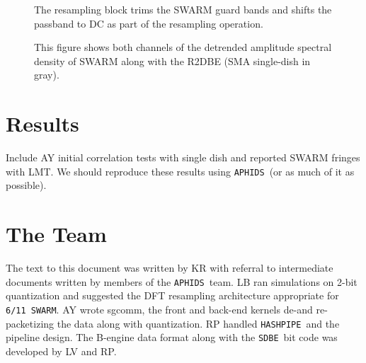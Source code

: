 \documentclass[11pt,preprint]{aastex}
\newcommand{\SWARM}[1]{\texttt{#1\,SWARM}}
\newcommand{\SDBE}{\texttt{SDBE}}
\newcommand{\APHIDS}{\texttt{APHIDS}}
\newcommand{\HASHPIPE}{\texttt{HASHPIPE}}
\begin{document}
\begin{figure}
\centering
{}
\label{fig:resampling_block}
\caption{The resampling block trims the SWARM guard bands and shifts the passband to DC as part of the 
resampling operation.}
\end{figure}

\begin{figure}[H]
\caption{This figure shows both channels of the detrended amplitude spectral density of SWARM along with the 
R2DBE (SMA single-dish in gray).}
\label{fig:swarm_amp_spec}
\end{figure}

\section{Results}

Include AY initial correlation tests with single dish and reported SWARM fringes with LMT.
We should reproduce these results using \APHIDS\ (or as much of it as possible).

\section{The Team}
The text to this document was written by KR with referral to intermediate documents written by
members of the \APHIDS\ team.  LB ran simulations on 2-bit quantization and suggested the DFT resampling 
architecture appropriate for \SWARM{6/11}. AY wrote sgcomm, the front and back-end kernels de-and re-packetizing 
the data along with quantization. RP handled \HASHPIPE\, and the pipeline design.  The B-engine data format along 
with the \SDBE\, bit code was developed by LV and RP.

\acknowledgments 
\clearpage


\end{document}
